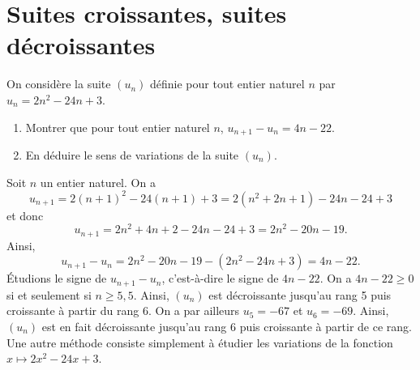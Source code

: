 \documentclass[11pt,fleqn]{book} %
\begin{document}

\section*{Suites croissantes, suites décroissantes}

\begin{exercise}[topic=rec03]On considère la suite $(u_n)$ définie pour tout entier naturel $n$ par $u_n=2n^2-24n+3$.
\begin{enumerate}
\item Montrer que pour tout entier naturel $n$, $u_{n+1}-u_n = 4n-22$.
\item En déduire le sens de variations de la suite $(u_n)$.
\end{enumerate}\end{exercise}


\begin{solution}Soit $n$ un entier naturel. On a
\[ u_{n+1}=2(n+1)^2-24(n+1)+3=2(n^2+2n+1)-24n-24+3\]
et donc
\[u_{n+1}=2n^2+4n+2-24n-24+3=2n^2-20n-19.\]
Ainsi,
\[ u_{n+1}-u_n = 2n^2-20n-19-(2n^2-24n+3)=4n-22.\]
Étudions le signe de $u_{n+1}-u_n$, c'est-à-dire le signe de $4n-22$. On a $4n-22 \geqslant 0$ si et seulement si $n \geqslant 5,5$. Ainsi, $(u_n)$ est décroissante jusqu'au rang 5 puis croissante à partir du rang 6. On a par ailleurs $u_5=-67$ et $u_6=-69$. Ainsi, $(u_n)$ est en fait décroissante jusqu'au rang 6 puis croissante à partir de ce rang. Une autre méthode consiste simplement à étudier les variations de la fonction $x\mapsto 2x^2-24x+3$.\end{solution}
\end{document}
